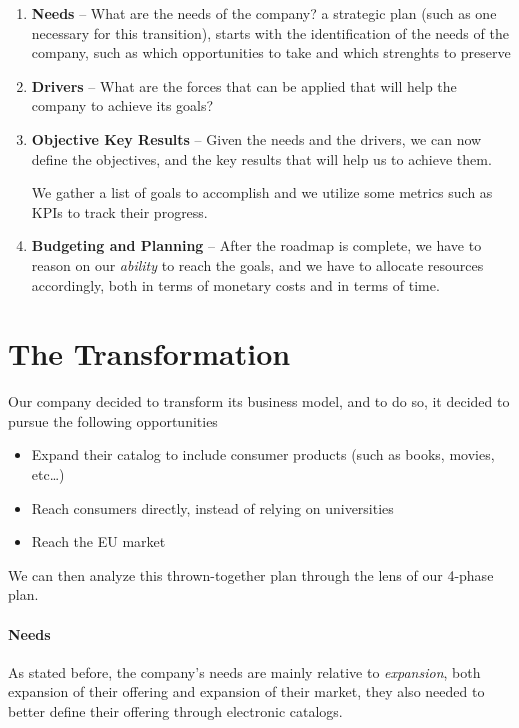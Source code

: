 \documentclass[openright, twoside, twocolumn]{report}
\begin{document}
\begin{enumerate}
  \item \textbf{Needs} -- What are the needs of the company? a strategic plan (such as one necessary for this transition), starts with the identification of the needs of the company, such
  as which opportunities to take and which strenghts to preserve
  \item \textbf{Drivers} -- What are the forces that can be applied that will help the company to achieve its goals?
  \item \textbf{Objective Key Results} -- Given the needs and the drivers, we can now define the objectives, and the key results that will help us to achieve them.

  We gather a list of goals to accomplish and we utilize some metrics such as KPIs to track their progress.

  \item \textbf{Budgeting and Planning} -- After the roadmap is complete, we have to reason on our \emph{ability} to reach the goals, and we have to allocate resources accordingly,
  both in terms of monetary costs and in terms of time.

\end{enumerate}

\section{The Transformation}

Our company decided to transform its business model, and to do so, it decided to pursue the following opportunities

\begin{itemize}
  \item Expand their catalog to include consumer products (such as books, movies, etc\dots)
  \item Reach consumers directly, instead of relying on universities
  \item Reach the EU market
\end{itemize}

We can then analyze this thrown-together plan through the lens of our 4-phase plan.

\paragraph{Needs}

As stated before, the company's needs are mainly relative to \emph{expansion}, both expansion of their offering and expansion of their market, they also needed
to better define their offering through electronic catalogs.
\end{document}
